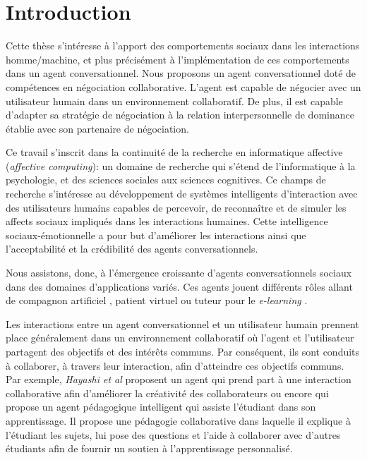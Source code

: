\chapter{Introduction}


Cette thèse s'intéresse à l'apport des comportements sociaux dans les interactions homme/machine, et plus précisément à l'implémentation de ces comportements dans un agent conversationnel. Nous proposons un agent conversationnel doté de compétences en négociation collaborative. L'agent est capable de négocier avec un utilisateur humain dans un environnement collaboratif. De plus, il est capable d'adapter sa stratégie de négociation à la relation interpersonnelle de dominance établie avec son partenaire de négociation. 


Ce travail s'inscrit dans la continuité de la recherche en informatique affective (\emph{affective computing}): un domaine de recherche qui s'étend de l'informatique à la psychologie, et des sciences sociales aux sciences cognitives. Ce champs de recherche s'intéresse au développement de systèmes intelligents d'interaction avec des utilisateurs humains capables de percevoir, de reconnaître et de simuler les affects sociaux impliqués dans les interactions humaines. Cette intelligence sociaux-émotionnelle a pour but d'améliorer les interactions ainsi que l'acceptabilité et la crédibilité des agents conversationnels. 

Nous assistons, donc, à l'émergence croissante d'agents conversationnels sociaux dans des domaines d'applications variés.  Ces agents jouent différents rôles allant de compagnon artificiel \cite{ring2013addressing,sidner2013always}, patient virtuel\cite{kenny2007virtual,kleinheksel2017virtual} ou tuteur pour le \emph{e-learning} \cite{kerly2008calmsystem,kerry2009conversational}.

Les interactions entre un agent conversationnel et un utilisateur humain prennent place généralement dans un environnement collaboratif où l'agent et l'utilisateur partagent des objectifs et des intérêts communs. 
Par conséquent, ils sont conduits à collaborer, à travers leur interaction, afin d'atteindre ces objectifs communs. 
Par exemple, \emph{Hayashi et al} proposent un agent qui prend part à une interaction collaborative afin d'améliorer la créativité des collaborateurs \cite{hayashi2013embodied} ou encore \cite{soliman2010intelligent} qui propose un agent pédagogique intelligent qui assiste  l'étudiant dans son apprentissage. Il propose une pédagogie collaborative dans laquelle il explique à l'étudiant les sujets, lui pose des questions et l'aide à collaborer avec d'autres étudiants afin de fournir un soutien à l'apprentissage personnalisé.

